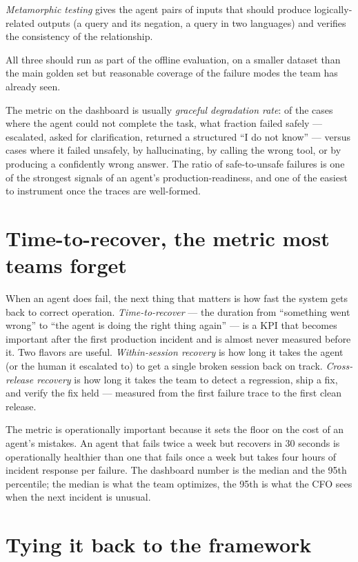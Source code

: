 \textit{Metamorphic testing} gives the agent pairs of inputs that should produce logically-related outputs (a query and its negation, a query in two languages) and verifies the consistency of the relationship.

All three should run as part of the offline evaluation, on a smaller dataset than the main golden set but reasonable coverage of the failure modes the team has already seen.

The metric on the dashboard is usually \textit{graceful degradation rate}: of the cases where the agent could not complete the task, what fraction failed safely --- escalated, asked for clarification, returned a structured ``I do not know'' --- versus cases where it failed unsafely, by hallucinating, by calling the wrong tool, or by producing a confidently wrong answer. The ratio of safe-to-unsafe failures is one of the strongest signals of an agent's production-readiness, and one of the easiest to instrument once the traces are well-formed.

\section{Time-to-recover, the metric most teams forget}

When an agent does fail, the next thing that matters is how fast the system gets back to correct operation. \textit{Time-to-recover} --- the duration from ``something went wrong'' to ``the agent is doing the right thing again'' --- is a KPI that becomes important after the first production incident and is almost never measured before it. Two flavors are useful. \textit{Within-session recovery} is how long it takes the agent (or the human it escalated to) to get a single broken session back on track. \textit{Cross-release recovery} is how long it takes the team to detect a regression, ship a fix, and verify the fix held --- measured from the first failure trace to the first clean release.

The metric is operationally important because it sets the floor on the cost of an agent's mistakes. An agent that fails twice a week but recovers in 30 seconds is operationally healthier than one that fails once a week but takes four hours of incident response per failure. The dashboard number is the median and the 95th percentile; the median is what the team optimizes, the 95th is what the CFO sees when the next incident is unusual.

\section{Tying it back to the framework}

